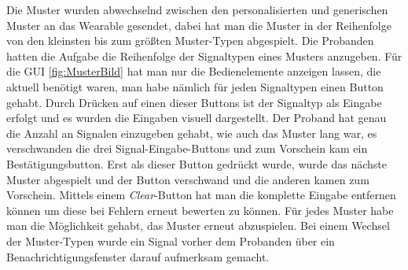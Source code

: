 
Die Muster wurden abwechselnd zwischen den personalisierten und generischen Muster an das Wearable gesendet, dabei hat man die Muster in der Reihenfolge von den kleinsten bis zum gr{\"o}{\ss}ten Muster-Typen abgespielt. 
Die Probanden hatten die Aufgabe die Reihenfolge der Signaltypen eines Musters anzugeben.
F{\"u}r die GUI \autoref{fig:MusterBild} hat man nur die Bedienelemente anzeigen lassen, die aktuell ben{\"o}tigt waren, man habe n{\"a}mlich f{\"u}r jeden Signaltypen einen Button gehabt. Durch Dr{\"u}cken auf einen dieser Buttons ist der Signaltyp als Eingabe erfolgt und es wurden die Eingaben visuell dargestellt.
Der Proband hat genau die Anzahl an Signalen einzugeben gehabt, wie auch das Muster lang war, es verschwanden die drei Signal-Eingabe-Buttons und zum Vorschein kam ein Best{\"a}tigungsbutton. Erst als dieser Button gedr{\"u}ckt wurde, wurde das n{\"a}chste Muster abgespielt und der Button verschwand und die anderen kamen zum Vorschein. 
Mittels einem \textit{Clear}-Button hat man die komplette Eingabe entfernen k{\"o}nnen um diese bei Fehlern erneut bewerten zu k{\"o}nnen.
F{\"u}r jedes Muster habe man die M{\"o}glichkeit gehabt, das Muster erneut abzuspielen.  
Bei einem Wechsel der Muster-Typen wurde ein Signal vorher dem Probanden {\"u}ber ein Benachrichtigungsfenster darauf aufmerksam gemacht.

